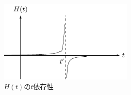 \documentclass[unicode,a4paper,10pt]{ltjsarticle}
\begin{document}
\begin{enumerate}
        \begin{figure}[ht]
          \centering
          \includegraphics[width=0.6\textwidth]{fig/fig03.pdf}
          \caption{$H(t)$の$t$依存性}
        \end{figure}

\end{enumerate}
\end{document}

